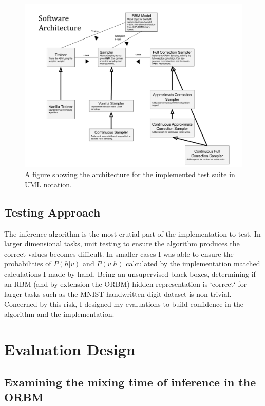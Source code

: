 \begin{figure}[h]
\begin{center}
  \includegraphics[width = 1\textwidth]{Assets/ENGR489-Architecture.png}
\caption{A figure showing the architecture for the implemented test suite in UML notation.}
\label{F:Prog-Arch}
\end{center}
\end{figure}

\subsection{Testing Approach}

The inference algorithm is the most crutial part of the implementation to test. In larger dimensional tasks, unit testing to ensure the algorithm produces the correct values becomes difficult. In smaller cases I was able to ensure the probabilities of $P(h|v)$ and $P(v|h)$ calculated by the implementation matched calculations I made by hand. Being an unsupervised black boxes, determining if an RBM (and by extension the ORBM) hidden representation is `correct` for larger tasks such as the MNIST handwritten digit dataset is non-trivial. Concerned by this risk, I designed my evaluations to build confidence in the algorithm and the implementation.

\section{Evaluation Design}
\subsection{Examining the mixing time of inference in the ORBM}

